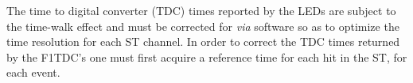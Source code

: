 The time to digital converter (TDC) times reported by the LEDs are subject to the time-walk effect and must be corrected for \textit{via} software so as to optimize the time resolution for each ST channel.  In order to correct the TDC times returned by the F1TDC's one must first acquire a reference time for each hit in the ST, for each event.  
